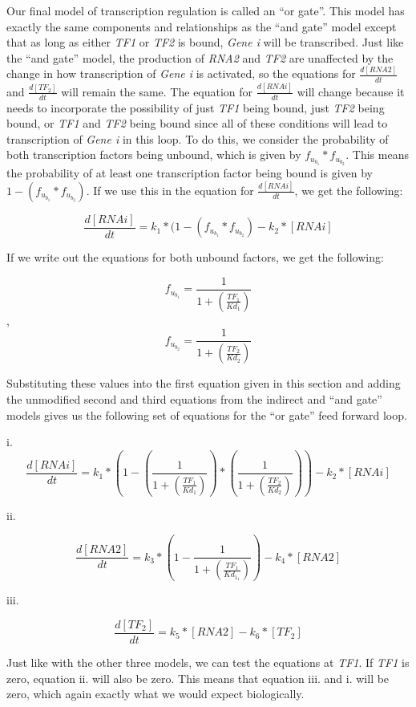 \documentclass{article}
\begin{document}
Our final model of transcription regulation is called an ``or gate''. This model has exactly the same components and relationships as the ``and gate'' model except that as long as either \textit{TF1} or \textit{TF2} is bound, \textit{Gene i} will be transcribed. Just like the ``and gate'' model, the production of \textit{RNA2} and \textit{TF2} are unaffected by the change in how transcription of \textit{Gene i} is activated, so the equations for \(\frac{d[RNA2]}{dt}\) and \(\frac{d[TF_2]}{dt}\) will remain the same. The equation for \(\frac{d[RNAi]}{dt}\) will change because it needs to incorporate the possibility of just \textit{TF1} being bound, just \textit{TF2} being bound, or \textit{TF1} and \textit{TF2} being bound since all of these conditions will lead to transcription of \textit{Gene i} in this loop. To do this, we consider the probability of both transcription factors being unbound, which is given by \(f_u_b_1 * f_u_b_2\). This means the probability of at least one transcription factor being bound is given by \(1 - (f_u_b_1 * f_u_b_2)\). If we use this in the equation for \(\frac{d[RNAi]}{dt}\), we get the following: 

\[
\frac{d[RNAi]}{dt} = k_1 * (1 - (f_u_b_1 * f_u_b_2) - k_2 * [RNAi]
\]

If we write out the equations for both unbound factors, we get the following:

\[f_u_b_1 = \frac{1}{1 + \left(\frac{TF_1}{Kd_1}\right)}\], \[f_u_b_2 = \frac{1}{1 + \left(\frac{TF_2}{Kd_2}\right)}\]

Substituting these values into the first equation given in this section and adding the unmodified second and third equations from the indirect and ``and gate'' models gives us the following set of equations for the ``or gate'' feed forward loop.

i. 
\[
\frac{d[RNAi]}{dt} = k_1 * (1 - (\frac{1}{1 + \left(\frac{TF_1}{Kd_1}\right)})*(\frac{1}{1 + \left(\frac{TF_2}{Kd_2}\right)})) - k_2 * [RNAi]
\]

ii. 

\[
\frac{d[RNA2]}{dt} = k_3 * \left(1 - \frac{1}{1 + \left(\frac{TF_1}{Kd_1_1}\right)}\right) - k_4 * [RNA2]
\]

iii. 

\[
\frac{d[TF_2]}{dt} = k_5 * [RNA2] - k_6 * [TF_2]
\]

Just like with the other three models, we can test the equations at \textit{TF1}. If \textit{TF1} is zero, equation ii. will also be zero. This means that equation iii. and i. will be zero, which again exactly what we would expect biologically. 
\end{document}
